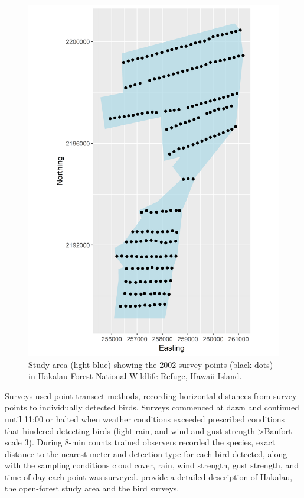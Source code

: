 \documentclass[preprint,12pt]{elsarticle}
\newcommand{\hawaii}{Hawai\textquotesingle i}   %
\begin{document}
\begin{figure}
	\centering
	\includegraphics[scale=0.5]{figures/2002studyareapoints_pt}
	\caption{Study area (light blue) showing the 2002 survey points (black dots) in Hakalau Forest National Wildlife Refuge, \hawaii{} Island.}
	\label{fig:2002studyareapointspt}
\end{figure}

Surveys used point-transect methods, recording horizontal distances from survey points to individually detected birds. Surveys commenced at dawn and continued until 11:00 or halted when weather conditions exceeded prescribed conditions that hindered detecting birds (light rain, and wind and gust strength \textgreater Baufort scale 3). During 8-min counts trained observers recorded the species, exact distance to the nearest meter and detection type for each bird detected, along with the sampling conditions cloud cover, rain, wind strength, gust strength, and time of day each point was surveyed.   \cite{camp_population_2010,camp_statespace_2016} provide a detailed description of Hakalau, the open-forest study area and the bird surveys.
\end{document}
